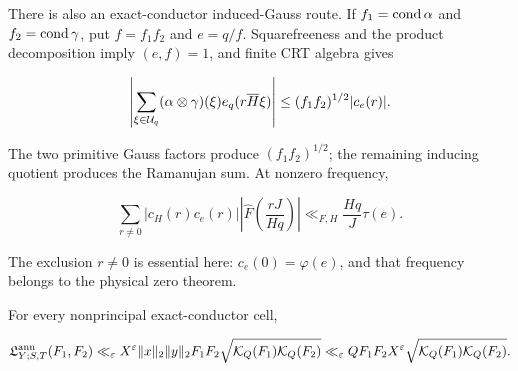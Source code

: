 There is also an exact-conductor induced-Gauss route.  If
\(f_1=\operatorname{cond}\alpha\) and \(f_2=\operatorname{cond}\gamma\), put
\(f=f_1f_2\) and \(e=q/f\).  Squarefreeness and the product
decomposition imply \((e,f)=1\), and finite CRT algebra
gives

\begin{equation}
 \left|
 \sum_{\xi\in\mathcal U_q}(\alpha\otimes\gamma)(\xi)
 e_q(r\overline H\xi)
 \right|
 \le (f_1f_2)^{1/2}|c_e(r)|.
 \label{eq:tpc26-induced-Gauss-factor}
\end{equation}

The two primitive Gauss factors produce \((f_1f_2)^{1/2}\); the
remaining inducing quotient produces the Ramanujan sum.  At nonzero
frequency,

\begin{equation}
 \sum_{r\ne0}|c_H(r)c_e(r)|
 \left|\widehat F\left(\frac{rJ}{Hq}\right)\right|
 \ll_{F,H}\frac{Hq}{J}\tau(e).
 \label{eq:tpc26-Ramanujan-frequency}
\end{equation}

The exclusion \(r\ne0\) is essential here: \(c_e(0)=\varphi(e)\), and
that frequency belongs to the physical zero theorem.

\begin{lemma}
\label{lem:tpc26-Gauss-route}
For every nonprincipal exact-conductor cell,

\begin{equation}
 \mathfrak L^{\rm ann}_{Y;S,T}(F_1,F_2)
 \ll_\varepsilon X^\varepsilon\|x\|_2\|y\|_2F_1F_2
 \sqrt{\mathcal K_Q(F_1)\mathcal K_Q(F_2)}
 \ll_\varepsilon QF_1F_2X^\varepsilon
 \sqrt{\mathcal K_Q(F_1)\mathcal K_Q(F_2)}.
 \label{eq:tpc26-Gauss-route}
\end{equation}
\end{lemma}

